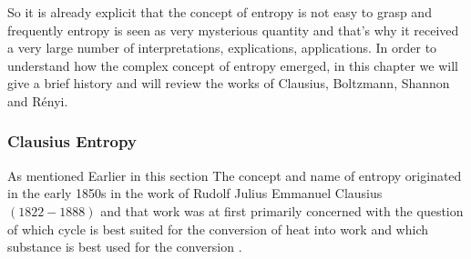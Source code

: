 	So it is already explicit that the concept of entropy is not easy to grasp and frequently entropy is seen as very mysterious quantity and that’s why it received a very large number of interpretations,
	explications, applications. In order to understand how the complex concept of entropy emerged,
	in this chapter we will give a brief history and will review the works of Clausius, Boltzmann,
	Shannon and R\'{e}nyi.

	\subsubsection{Clausius Entropy}	
	As mentioned Earlier in this section The concept and name of entropy originated in the early 1850s in the work of Rudolf Julius Emmanuel Clausius $(1822-1888)$ and that work was at first	primarily concerned with the question of which cycle is best suited for the conversion of heat into	work and which substance is best used for the conversion \cite{Clausius1867}.
		
